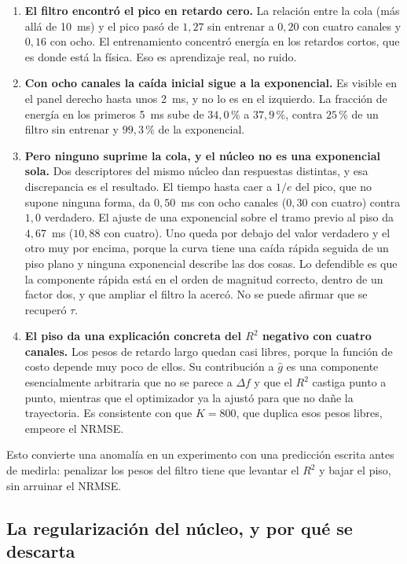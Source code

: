 \documentclass[11pt,a4paper]{article}
\begin{document}
\begin{enumerate}
\item \textbf{El filtro encontró el pico en retardo cero.} La relación entre la
  cola (más allá de 10~ms) y el pico pasó de $1{,}27$ sin entrenar a $0{,}20$
  con cuatro canales y $0{,}16$ con ocho. El entrenamiento concentró energía en
  los retardos cortos, que es donde está la física. Eso es aprendizaje real, no
  ruido.
\item \textbf{Con ocho canales la caída inicial sigue a la exponencial.} Es
  visible en el panel derecho hasta unos 2~ms, y no lo es en el izquierdo. La
  fracción de energía en los primeros 5~ms sube de $34{,}0\,\%$ a $37{,}9\,\%$,
  contra $25\,\%$ de un filtro sin entrenar y $99{,}3\,\%$ de la exponencial.
\item \textbf{Pero ninguno suprime la cola, y el núcleo no es una exponencial
  sola.} Dos descriptores del mismo núcleo dan respuestas distintas, y esa
  discrepancia es el resultado. El tiempo hasta caer a $1/e$ del pico, que no
  supone ninguna forma, da $0{,}50$~ms con ocho canales ($0{,}30$ con cuatro)
  contra $1{,}0$ verdadero. El ajuste de una exponencial sobre el tramo previo
  al piso da $4{,}67$~ms ($10{,}88$ con cuatro). Uno queda por debajo del valor
  verdadero y el otro muy por encima, porque la curva tiene una caída rápida
  seguida de un piso plano y ninguna exponencial describe las dos cosas. Lo
  defendible es que la componente rápida está en el orden de magnitud correcto,
  dentro de un factor dos, y que ampliar el filtro la acercó. No se puede
  afirmar que se recuperó $\tau$.
\item \textbf{El piso da una explicación concreta del $R^2$ negativo con cuatro
  canales.} Los pesos de retardo largo quedan casi libres, porque la función de
  costo depende muy poco de ellos. Su contribución a $\hat{g}$ es una
  componente esencialmente arbitraria que no se parece a $\Delta f$ y que el
  $R^2$ castiga punto a punto, mientras que el optimizador ya la ajustó para
  que no dañe la trayectoria. Es consistente con que $K = 800$, que duplica esos
  pesos libres, empeore el NRMSE.
\end{enumerate}

Esto convierte una anomalía en un experimento con una predicción escrita antes
de medirla: penalizar los pesos del filtro tiene que levantar el $R^2$ y bajar
el piso, sin arruinar el NRMSE.

\subsection{La regularización del núcleo, y por qué se descarta}
\end{document}
